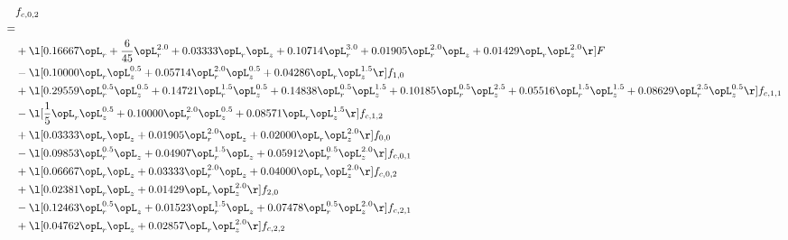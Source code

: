 \begin{alignat}{2} 
\label{eq:f_02_1} 
& f_{c,0,2} \nonumber \\ 
 = \\ 
& + \l[  0.16667 \opL_r + \frac{6}{45} \opL_r^{2.0} +  0.03333 \opL_r \opL_z +  0.10714 \opL_r^{3.0} +  0.01905 \opL_r^{2.0} \opL_z +  0.01429 \opL_r \opL_z^{2.0}  \r] F \nonumber \\ 
& - \l[  0.10000 \opL_r \opL_z^{0.5} +  0.05714 \opL_r^{2.0} \opL_z^{0.5} +  0.04286 \opL_r \opL_z^{1.5}  \r] f_{1,0} \nonumber \\ 
& + \l[  0.29559 \opL_r^{0.5} \opL_z^{0.5} +  0.14721 \opL_r^{1.5} \opL_z^{0.5} +  0.14838 \opL_r^{0.5} \opL_z^{1.5} +  0.10185 \opL_r^{0.5} \opL_z^{2.5} +  0.05516 \opL_r^{1.5} \opL_z^{1.5} +  0.08629 \opL_r^{2.5} \opL_z^{0.5}  \r] f_{c,1,1} \nonumber \\ 
& - \l[ \frac{1}{5} \opL_r \opL_z^{0.5} +  0.10000 \opL_r^{2.0} \opL_z^{0.5} +  0.08571 \opL_r \opL_z^{1.5}  \r] f_{c,1,2} \nonumber \\ 
& + \l[  0.03333 \opL_r \opL_z +  0.01905 \opL_r^{2.0} \opL_z +  0.02000 \opL_r \opL_z^{2.0}  \r] f_{0,0} \nonumber \\ 
& - \l[  0.09853 \opL_r^{0.5} \opL_z +  0.04907 \opL_r^{1.5} \opL_z +  0.05912 \opL_r^{0.5} \opL_z^{2.0}  \r] f_{c,0,1} \nonumber \\ 
& + \l[  0.06667 \opL_r \opL_z +  0.03333 \opL_r^{2.0} \opL_z +  0.04000 \opL_r \opL_z^{2.0}  \r] f_{c,0,2} \nonumber \\ 
& + \l[  0.02381 \opL_r \opL_z +  0.01429 \opL_r \opL_z^{2.0}  \r] f_{2,0} \nonumber \\ 
& - \l[  0.12463 \opL_r^{0.5} \opL_z +  0.01523 \opL_r^{1.5} \opL_z +  0.07478 \opL_r^{0.5} \opL_z^{2.0}  \r] f_{c,2,1} \nonumber \\ 
& + \l[  0.04762 \opL_r \opL_z +  0.02857 \opL_r \opL_z^{2.0}  \r] f_{c,2,2} \nonumber \\ 
\end{alignat} 


